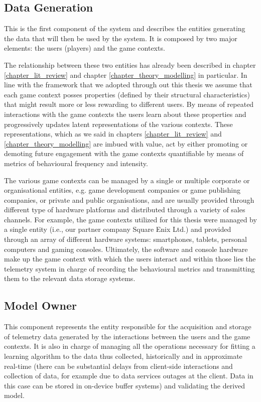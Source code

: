 \subsection{Data Generation}
\label{data_generation}
This is the first component of the system and describes the entities generating the data that will then be used by the system. It is composed by two major elements: the users (players) and the game contexts. 

The relationship between these two entities has already been described in chapter \ref{chapter_lit_review} and chapter \ref{chapter_theory_modelling} in particular. In line with the framework that we adopted through out this thesis we assume that each game context posses properties (defined by their structural characteristics) that might result more or less rewarding to different users. By means of repeated interactions with the game contexts the users learn about these properties and progressively updates latent representations of the various contexts. These representations, which as we said in chapters \ref{chapter_lit_review} and \ref{chapter_theory_modelling} are imbued with value, act by either promoting or demoting future engagement with the game contexts quantifiable by means of metrics of behavioural frequency and intensity.

The various game contexts can be managed by a single or multiple corporate or organisational entities, e.g. game development companies or game publishing companies, or private and public organisations, and are usually provided through different type of hardware platforms and distributed through a variety of sales channels. For example, the game contexts utilized for this thesis were managed by a single entity (i.e., our partner company Square Enix Ltd.) and provided through an array of different hardware systems: smartphones, tablets, personal computers and gaming consoles. Ultimately, the software and console hardware make up the game context with which the users interact and within those lies the telemetry system in charge of recording the behavioural metrics and transmitting them to the relevant data storage systems.

\subsection{Model Owner}
\label{model_owner}
This component represents the entity responsible for the acquisition and storage of telemetry data generated by the interactions between the users and the game contexts. It is also in charge of managing all the operations necessary for fitting a learning algorithm to the data thus collected, historically and in approximate real-time (there can be substantial delays from client-side interactions and collection of data, for example due to data services outages at the client. Data in this case can be stored in on-device buffer systems) and validating the derived model. 

